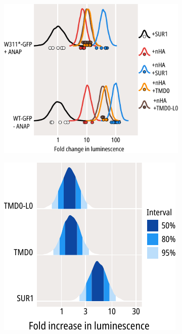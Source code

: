 \begin{figure}[h]
	\centering
	\begin{subfigure}[t]{0.45\textwidth}
		\caption{}\label{ch6fig:tmd0s_surface_expression_1}
		\centering
		\includegraphics[width=\textwidth]{tmd0s_surface_expression_1.pdf}
	\end{subfigure}
	\hfill
	\begin{subfigure}[t]{0.45\textwidth}
		\caption{}\label{ch6fig:tmd0s_surface_expression_2}
		\centering
		\includegraphics[width=\textwidth]{tmd0s_surface_expression_2.pdf}

\end{subfigure}
\end{figure}
